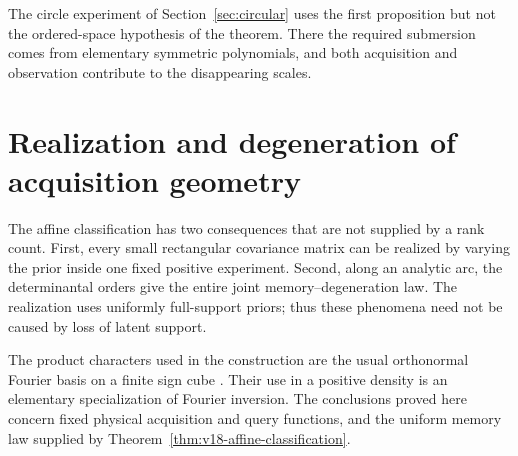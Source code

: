 \documentclass[11pt]{amsart}
\theoremstyle{definition}\newtheorem{definition}[theorem]{Definition}
\theoremstyle{remark}\newtheorem{remark}[theorem]{Remark}
\begin{document}
The circle experiment of Section~\ref{sec:circular} uses the first
proposition but not the ordered-space hypothesis of the theorem. There
the required submersion comes from elementary symmetric polynomials,
and both acquisition and observation contribute to the disappearing
scales.

\section{Realization and degeneration of acquisition geometry}
\label{sec:v19-degeneration}
The affine classification has two consequences that are not supplied
by a rank count. First, every small rectangular covariance matrix can
be realized by varying the prior inside one fixed positive experiment.
Second, along an analytic arc, the determinantal orders give the entire
joint memory--degeneration law. The realization uses uniformly
full-support priors; thus these phenomena need not be caused by loss
of latent support.

The product characters used in the construction are the usual
orthonormal Fourier basis on a finite sign cube
\cite[Section 2.2]{deWolf2008}. Their use in a positive density is an
elementary specialization of Fourier inversion. The conclusions proved
here concern fixed physical acquisition and query functions, and the
uniform memory law supplied by Theorem~\ref{thm:v18-affine-classification}.
\end{document}
